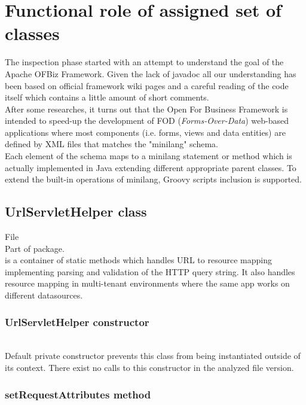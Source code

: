 \section{Functional role of assigned set of classes}
The inspection phase started with an attempt to understand the goal of the Apache OFBiz Framework. Given the lack of javadoc all our understanding has been based on official framework wiki pages and a careful reading of the code itself which contains a little amount of short comments.\\
After some researches, it turns out that the Open For Business Framework is intended to speed-up the development of FOD (\textit{Forms-Over-Data}) web-based applications where most components (i.e. forms, views and data entities) are defined by XML files that matches the "minilang" schema.\\
Each element of the schema maps to a minilang statement or method which is actually implemented in Java extending different appropriate parent classes. To extend the built-in operations of minilang, Groovy scripts inclusion is supported.

\subsection{UrlServletHelper class}
File \\
Part of  package.\\
\newline
{} is a container of static methods which handles URL to resource mapping implementing parsing and validation of the HTTP query string. It also handles resource mapping in multi-tenant environments where the same app works on different datasources.\\

\subsubsection{UrlServletHelper constructor}
\\

Default private constructor prevents this class from being instantiated outside of its context. There exist no calls to this constructor in the analyzed file version.

\subsubsection{setRequestAttributes method}
\\\\ %


